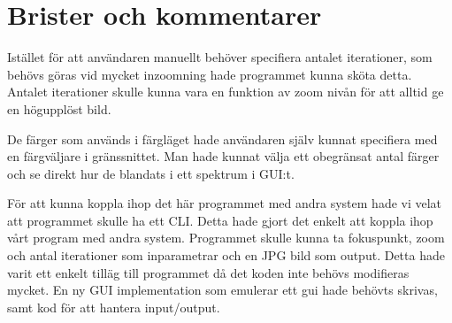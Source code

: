 \documentclass[a4paper]{article}
\begin{document}
\section{Brister och kommentarer}
Istället för att användaren manuellt behöver specifiera antalet iterationer, som behövs göras vid mycket inzoomning hade programmet kunna sköta detta. Antalet iterationer skulle kunna vara en funktion av zoom nivån för att alltid ge en högupplöst bild.

De färger som används i färgläget hade användaren själv kunnat specifiera med en färgväljare i gränssnittet. Man hade kunnat välja ett obegränsat antal färger och se direkt hur de blandats i ett spektrum i GUI:t.

För att kunna koppla ihop det här programmet med andra system hade vi velat att programmet skulle ha ett CLI. Detta hade gjort det enkelt att koppla ihop vårt program med andra system. Programmet skulle kunna ta fokuspunkt, zoom och antal iterationer som inparametrar och en JPG bild som output. Detta hade varit ett enkelt tilläg till programmet då det koden inte behövs modifieras mycket. En ny GUI implementation som emulerar ett gui hade behövts skrivas, samt kod för att hantera input/output.
\end{document}
